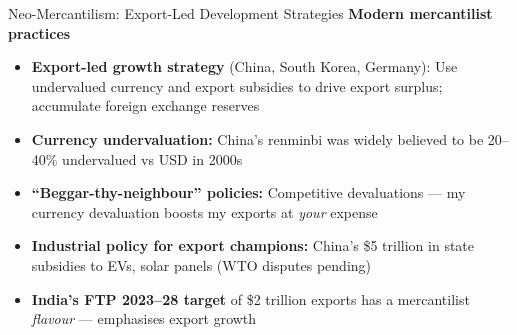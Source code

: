 \documentclass[
  ignorenonframetext,
  aspectratio=169,
]{beamer}
\makeatletter
\providecommand{\tightlist}{%
  \setlength{\itemsep}{0pt}\setlength{\parskip}{0pt}}
\let\quarto@originallabel\label
\DeclareRobustCommand*{\label}[1]{\quarto@originallabel{#1}}
\makeatother
\begin{document}
\begin{frame}{Neo-Mercantilism: Export-Led Development Strategies}
\label{neo-mercantilism-export-led-development-strategies}
\textbf{Modern mercantilist practices}

\begin{itemize}
\tightlist
\item
  \textbf{Export-led growth strategy} (China, South Korea, Germany): Use
  undervalued currency and export subsidies to drive export surplus;
  accumulate foreign exchange reserves
\item
  \textbf{Currency undervaluation:} China's renminbi was widely believed
  to be 20--40\% undervalued vs USD in 2000s
\item
  \textbf{``Beggar-thy-neighbour'' policies:} Competitive devaluations
  --- my currency devaluation boosts my exports at \emph{your} expense
\item
  \textbf{Industrial policy for export champions:} China's \$5 trillion
  in state subsidies to EVs, solar panels (WTO disputes pending)
\item
  \textbf{India's FTP 2023--28 target} of \$2 trillion exports has a
  mercantilist \emph{flavour} --- emphasises export growth
\end{itemize}

\end{frame}
\end{document}
